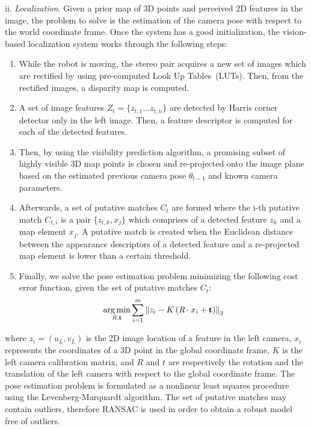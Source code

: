 ii. \textit{Localization}. Given a prior map of 3D points and perceived 2D features in the image, the problem to solve is the estimation of the camera pose with respect to the world coordinate frame. Once the system has a good initialization, the vision-based localization system works through the
following steps:
%
\begin{enumerate}
\item While the robot is moving, the stereo pair acquires a new set of images which are rectified by using pre-computed Look Up Tables~(LUTs). Then, from the rectified images, a disparity map is computed.
\item A set of image features $Z_{t}=\{z_{t,1} \ldots z_{t,n}\}$ are detected by Harris corner detector only in the left image. Then, a feature descriptor is computed for each of the detected features.
\item Then, by using the visibility prediction algorithm, a promising subset of highly visible 3D map points is chosen and re-projected onto the image plane based on the estimated previous camera pose $\theta_{t-1}$ and known camera parameters.
\item Afterwards, a set of putative matches $C_{t}$ are formed where the i-th putative match $C_{t,i}$ is a pair $\{z_{t,k},x_{j}\}$ which comprises of a detected feature $z_{k}$ and a map element $x_{j}$. A putative match is created when the Euclidean distance between the appearance descriptors of a detected feature and a re-projected map element is lower than a certain threshold.
\item Finally, we solve the pose estimation problem minimizing the following cost error function, given the set of putative matches $C_{t}$:
%
\begin{equation} \label{eq:pose_estimation}
\argmin \limits_{\emph{R},\mathbf{t}} \sum \limits_{i=1}^{m} \left\|z_{i} - K \left(\emph{R}\cdot x_{i} + \mathbf{t} \right)\right\|_{2}
\end{equation}
%
\end{enumerate}
%
where $z_{i}=\left(u_{L},v_{L}\right)$ is the 2D image location of a feature in the left camera, $x_{i}$ represents the coordinates of a 3D point in the global coordinate frame, $K$ is the left camera calibration matrix, and $R$ and $t$ are respectively the rotation and the translation of the left camera with respect to the global coordinate frame. The pose estimation problem is formulated as a nonlinear least squares procedure using the Levenberg-Marquardt algorithm. The set of putative matches may contain outliers, therefore RANSAC is used in order to obtain a robust model free of outliers.

